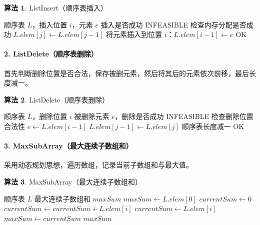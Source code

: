 \documentclass[supercite]{Experimental_Report}
\theoremstyle{definition}
\newtheorem{alg}{算法}[section]
\begin{document}
\begin{shaded*}
\begin{alg}{ListInsert（顺序表插入）}
    \label{alg:ListInsert}
    \begin{algorithmic}
        \Input 顺序表 $L$，插入位置 $i$，元素 $e$
        \Output 插入是否成功
            \State \Return INFEASIBLE
        \EndIf
        \State 检查内存分配是否成功
            \State $L.elem[j] \gets L.elem[j-1]$
        \EndFor
        \State 将元素插入到位置 $i$：$L.elem[i-1] \gets e$
        \State \Return OK
    \end{algorithmic}
\end{alg}
\end{shaded*}

\paragraph{2. ListDelete（顺序表删除）}
首先判断删除位置是否合法，保存被删元素，然后将其后的元素依次前移，最后长度减一。

\begin{shaded*}
\begin{alg}{ListDelete（顺序表删除）}
    \label{alg:ListDelete}
    \begin{algorithmic}
        \Input 顺序表 $L$，删除位置 $i$
        \Output 被删除元素 $e$，删除是否成功
            \State \Return INFEASIBLE
        \EndIf
        \State 检查删除位置合法性
        \State $e \gets L.elem[i-1]$
            \State $L.elem[j-1] \gets L.elem[j]$
        \EndFor
        \State 顺序表长度减一
        \State \Return OK
    \end{algorithmic}
\end{alg}
\end{shaded*}

\paragraph{3. MaxSubArray（最大连续子数组和）}
采用动态规划思想，遍历数组，记录当前子数组和与最大值。

\begin{shaded*}
\begin{alg}{MaxSubArray（最大连续子数组和）}
    \label{alg:MaxSubArray}
    \begin{algorithmic}
        \Input 顺序表 $L$
        \Output 最大连续子数组和 $maxSum$
        \State $maxSum \gets L.elem[0]$
        \State $currentSum \gets 0$
                \State $currentSum \gets currentSum + L.elem[i]$
            \Else
                \State $currentSum \gets L.elem[i]$
            \EndIf
                \State $maxSum \gets currentSum$
            \EndIf
        \EndFor
        \State \Return $maxSum$
    \end{algorithmic}
\end{alg}
\end{shaded*}
\end{document}
